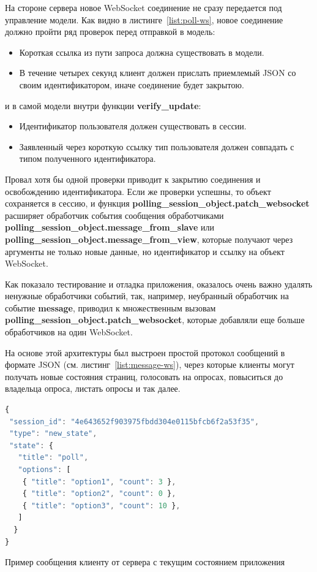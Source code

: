На стороне сервера новое WebSocket соединение не сразу передается под управление модели. Как видно в листинге~\ref{list:poll-ws}, новое соединение должно пройти ряд проверок перед отправкой в модель:
   \begin{itemize}
   	\item Короткая ссылка из пути запроса должна существовать в модели.
   	\item В течение четырех секунд клиент должен прислать приемлемый JSON со своим идентификатором, иначе соединение будет закрытою.
   \end{itemize}
и в самой модели внутри функции \textbf{verify\_update}:
    \begin{itemize}
 	\item Идентификатор пользователя должен существовать в сессии.
 	\item Заявленный через короткую ссылку тип пользователя должен совпадать с типом полученного идентификатора.
 	\end{itemize}
Провал хотя бы одной проверки приводит к закрытию соединения и освобождению идентификатора. Если же проверки успешны, то объект сохраняется в сессию, и функция  \textbf{polling\_session\_object.patch\_websocket} расширяет обработчик события сообщения обработчиками \textbf{polling\_session\_object.message\_from\_slave} или \textbf{polling\_session\_object.message\_from\_view}, которые получают через аргументы не только новые данные, но идентификатор и ссылку на объект WebSocket.

Как показало тестирование и отладка приложения, оказалось очень важно удалять ненужные обработчики событий, так, например, неубранный обработчик на событие \textbf{message}, приводил к множественным вызовам  \textbf{polling\_session\_object.patch\_websocket}, которые добавляли еще больше обработчиков на один WebSocket. 

На основе этой архитектуры был выстроен простой протокол сообщений в формате JSON (см. листинг~\ref{list:message-ws}), через которые клиенты могут получать новые состояния страниц, голосовать на опросах, повыситься до владельца опроса, листать опросы и так далее.
 \begin{ListingEnv}
 	\begin{lstlisting}[language=JavaScript]
{
 "session_id": "4e643652f903975fbdd304e0115bfcb6f2a53f35",
 "type": "new_state",
 "state": {
   "title": "poll",
   "options": [
	{ "title": "option1", "count": 3 },
	{ "title": "option2", "count": 0 },
	{ "title": "option3", "count": 10 },
   ]
  }
}
 	\end{lstlisting}
 	\caption{Пример сообщения клиенту от сервера с текущим состоянием приложения}
 	\label{list:message-ws}
 \end{ListingEnv}

